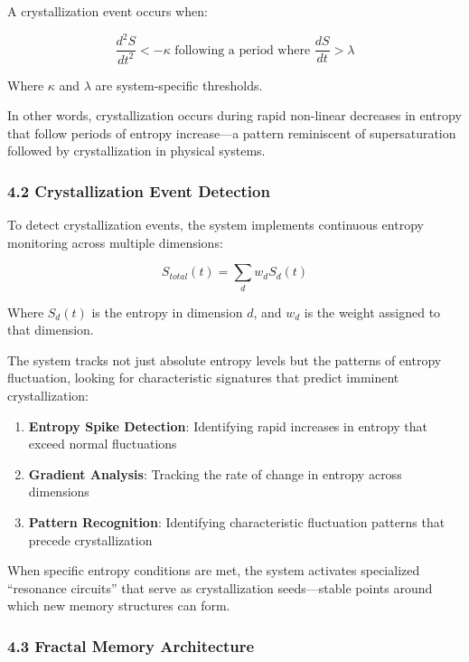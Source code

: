 \documentclass[12pt]{article}
\providecommand{\tightlist}{%
  \setlength{\itemsep}{0pt}\setlength{\parskip}{0pt}}
\begin{document}
A crystallization event occurs when:

\[\frac{d^2S}{dt^2} < -\kappa \text{ following a period where } \frac{dS}{dt} > \lambda\]

Where \(\kappa\) and \(\lambda\) are system-specific thresholds.

In other words, crystallization occurs during rapid non-linear decreases
in entropy that follow periods of entropy increase---a pattern
reminiscent of supersaturation followed by crystallization in physical
systems.

\subsubsection{4.2 Crystallization Event
Detection}\label{crystallization-event-detection}

To detect crystallization events, the system implements continuous
entropy monitoring across multiple dimensions:

\[S_{total}(t) = \sum_d w_d S_d(t)\]

Where \(S_d(t)\) is the entropy in dimension \(d\), and \(w_d\) is the
weight assigned to that dimension.

The system tracks not just absolute entropy levels but the patterns of
entropy fluctuation, looking for characteristic signatures that predict
imminent crystallization:

\begin{enumerate}
\def\labelenumi{\arabic{enumi}.}
\tightlist
\item
  \textbf{Entropy Spike Detection}: Identifying rapid increases in
  entropy that exceed normal fluctuations
\item
  \textbf{Gradient Analysis}: Tracking the rate of change in entropy
  across dimensions
\item
  \textbf{Pattern Recognition}: Identifying characteristic fluctuation
  patterns that precede crystallization
\end{enumerate}

When specific entropy conditions are met, the system activates
specialized ``resonance circuits'' that serve as crystallization
seeds---stable points around which new memory structures can form.

\subsubsection{4.3 Fractal Memory
Architecture}\label{fractal-memory-architecture}
\end{document}
